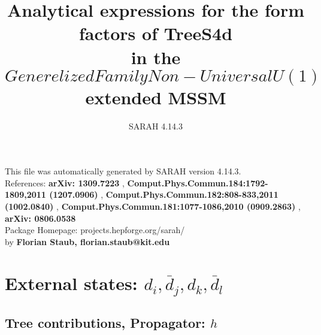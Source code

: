\documentclass[A4,landscape]{article}
\begin{document}
\title{Analytical expressions for the form factors of TreeS4d\\ in the $Generelized Family Non-Universal U(1)$ extended MSSM } 
 \author{SARAH 4.14.3} 
 \maketitle 
 \vspace{10cm} 
This file was automatically generated by SARAH version 4.14.3.  \\ 
References: {\bf arXiv: 1309.7223 }, {\bf Comput.Phys.Commun.184:1792-1809,2011 (1207.0906) }, {\bf Comput.Phys.Commun.182:808-833,2011 (1002.0840) }, {\bf Comput.Phys.Commun.181:1077-1086,2010 (0909.2863) }, {\bf arXiv: 0806.0538 } \\ 
Package Homepage: projects.hepforge.org/sarah/ \\ 
by {\bf Florian Staub, florian.staub@kit.edu} 
 \pagebreak 
 \tableofcontents 
 \pagebreak 
\section{External states: ${d_{{i}}, \bar{d}_{{j}}, d_{{k}}, \bar{d}_{{l}}}$} 
\subsection{Tree contributions, Propagator: $h$} 
\end{document}
